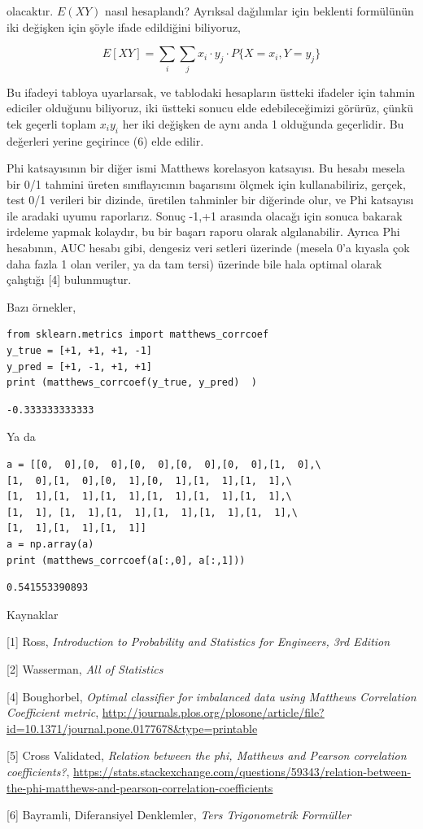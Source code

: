 \documentclass[12pt,fleqn]{article}\usepackage{../../common}
\begin{document}
olacaktır. $E(XY)$ nasıl hesaplandı? Ayrıksal dağılımlar için beklenti
formülünün iki değişken için şöyle ifade edildiğini biliyoruz,

$$  E[XY] = \sum_i\sum_j x_i\cdot y_j \cdot P\{X = x_i, Y = y_j\} $$

Bu ifadeyi tabloya uyarlarsak, ve tablodaki hesapların üstteki ifadeler
için tahmin ediciler olduğunu biliyoruz, iki üstteki sonucu elde
edebileceğimizi görürüz, çünkü tek geçerli toplam $x_i y_i$ her iki
değişken de aynı anda 1 olduğunda geçerlidir. Bu değerleri yerine geçirince
(6) elde edilir.

Phi katsayısının bir diğer ismi Matthews korelasyon katsayısı. Bu hesabı
mesela bir 0/1 tahmini üreten sınıflayıcının başarısını ölçmek için
kullanabiliriz, gerçek, test 0/1 verileri bir dizinde, üretilen tahminler
bir diğerinde olur, ve Phi katsayısı ile aradaki uyumu raporlarız. Sonuç
-1,+1 arasında olacağı için sonuca bakarak irdeleme yapmak kolaydır, bu bir
başarı raporu olarak algılanabilir. Ayrıca Phi hesabının, AUC hesabı gibi,
dengesiz veri setleri üzerinde (mesela 0'a kıyasla çok daha fazla 1 olan
veriler, ya da tam tersi) üzerinde bile hala optimal olarak çalıştığı [4]
bulunmuştur.

Bazı örnekler,

\begin{verbatim}
from sklearn.metrics import matthews_corrcoef
y_true = [+1, +1, +1, -1]
y_pred = [+1, -1, +1, +1]
print (matthews_corrcoef(y_true, y_pred)  )
\end{verbatim}

\begin{verbatim}
-0.333333333333
\end{verbatim}

Ya da

\begin{verbatim}
a = [[0,  0],[0,  0],[0,  0],[0,  0],[0,  0],[1,  0],\
[1,  0],[1,  0],[0,  1],[0,  1],[1,  1],[1,  1],\
[1,  1],[1,  1],[1,  1],[1,  1],[1,  1],[1,  1],\
[1,  1], [1,  1],[1,  1],[1,  1],[1,  1],[1,  1],\
[1,  1],[1,  1],[1,  1]]
a = np.array(a)
print (matthews_corrcoef(a[:,0], a[:,1]))
\end{verbatim}

\begin{verbatim}
0.541553390893
\end{verbatim}


Kaynaklar

[1] Ross, {\em Introduction to Probability and Statistics for Engineers, 3rd Edition}

[2] Wasserman, {\em All of Statistics}

[4] Boughorbel, {\em Optimal classifier for imbalanced data using Matthews Correlation Coefficient metric}, \url{http://journals.plos.org/plosone/article/file?id=10.1371/journal.pone.0177678&type=printable}

[5] Cross Validated, {\em Relation between the phi, Matthews and Pearson correlation coefficients?}, \url{https://stats.stackexchange.com/questions/59343/relation-between-the-phi-matthews-and-pearson-correlation-coefficients}

[6] Bayramli, Diferansiyel Denklemler, {\em Ters Trigonometrik Formüller}
\end{document}
